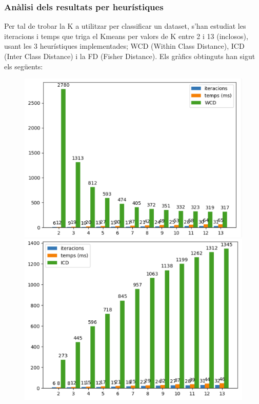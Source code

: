 \documentclass[a4paper, 11pt]{article}
\begin{document}
\subsubsection{Anàlisi dels resultats per heurístiques}
Per tal de trobar la K a utilitzar per classificar un dataset, s'han estudiat les iteracions i temps que triga el Kmeans per valors de K entre 2 i 13 (inclosos), usant les 3 heurístiques implementades; WCD (Within Class Distance), ICD (Inter Class Distance) i la FD (Fisher Distance). Els gràfics obtinguts han sigut els següents:
\begin{figure}[h!]
\centering
\begin{minipage}{.33\textwidth}
  \centering
  \includegraphics[width=.8\linewidth]{kstatisticsWCD.PNG}
\end{minipage}%
\begin{minipage}{.33\textwidth}
  \centering
  \includegraphics[width=.8\linewidth]{kstatisticsICD.PNG}
\end{minipage}%
\begin{minipage}{.33\textwidth}
  \centering

\end{minipage}
\end{figure}
\end{document}
